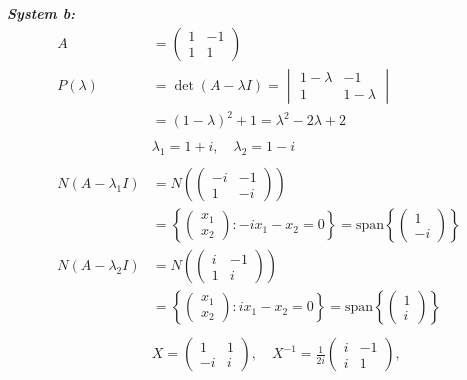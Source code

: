 \documentclass{article}
\begin{document}
\newpage
\noindent\textbf{\textit{System b:}}
\begin{align*}
    A &= \begin{pmatrix} 1 & -1 \\ 1 & 1 \end{pmatrix} \\
    P(\lambda) &= \det(A - \lambda I) = \begin{vmatrix} 1 - \lambda & -1 \\ 1 & 1 - \lambda \end{vmatrix} \\
    &= (1 - \lambda)^2 + 1 = \lambda^2 - 2\lambda + 2 \\
    \\
    &\lambda_1 = 1 + i, \quad \lambda_2 = 1 - i \\
    \\
    N(A - \lambda_1 I) &= N\left(\begin{pmatrix} -i & -1 \\ 1 & -i \end{pmatrix}\right) \\
    &= \left\{ \begin{pmatrix} x_1 \\ x_2 \end{pmatrix} : -ix_1 - x_2 = 0 \right\}
    = \text{span}\left\{ \begin{pmatrix} 1 \\ -i \end{pmatrix} \right\} \\
    N(A - \lambda_2 I) &= N\left(\begin{pmatrix} i & -1 \\ 1 & i \end{pmatrix}\right) \\
    &= \left\{ \begin{pmatrix} x_1 \\ x_2 \end{pmatrix} : ix_1 - x_2 = 0 \right\}
    = \text{span}\left\{ \begin{pmatrix} 1 \\ i \end{pmatrix} \right\} \\
    \\
    &X = \begin{pmatrix} 1 & 1 \\ -i & i \end{pmatrix} , \quad
    X^{-1} = \frac{1}{2i} \begin{pmatrix} i & -1 \\ i & 1 \end{pmatrix} , \quad

\end{align*}
\end{document}
